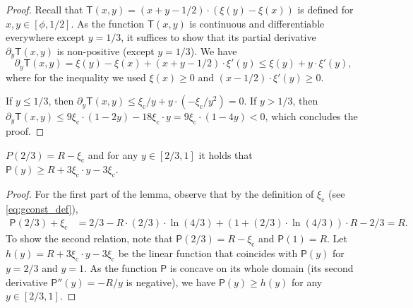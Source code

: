 \documentclass[a4paper,USenglish,cleveref]{lipics-v2019}
\newcommand{\R}{\ensuremath{R}}
\newcommand{\smallBoundary}{\ensuremath{\phi}}
\newcommand{\gconst}{\ensuremath{\xi_\mathrm{c}}}
\newcommand{\g}{\ensuremath{\xi}}
\newcommand{\cutintegral}{\textsf{P}}
\newcommand{\T}{\textsf{T}}
\begin{document}
  \begin{proof}
  Recall that $\T(x,y) = (x+y-1/2) \cdot (\g(y) - \g(x))$ is defined for $x,y \in [\smallBoundary,1/2]$.
  As the function $\T(x,y)$ is continuous and differentiable everywhere except $y = 1/3$,
  it suffices to show that its partial derivative $\partial_y \T(x,y)$ is non-positive (except $y = 1/3$).
  We have 
  \[
    \partial_y \T(x,y) = \g(y) - \g(x) + (x+y-1/2) \cdot \g'(y) \leq \g(y) + y \cdot \g'(y),
  \]
  where for the inequality we used $\g(x) \geq 0$ and $(x-1/2) \cdot \g'(y) \geq 0$.
  
  If $y \leq 1/3$, then $\partial_y \T(x,y)
  \leq \gconst/y + y \cdot (- \gconst/y^2) = 0$. If $y > 1/3$, then $\partial_y
  \T(x,y) \leq 9 \gconst \cdot (1 - 2y) - 18 \gconst \cdot y = 9 \gconst \cdot (1-4y) <
  0$, which concludes the proof.
  \end{proof}
  
    
  


\begin{lemma}
  \label{lem:P2x_approx}
  $P(2/3) = \R - \gconst$ and 
  for any $y \in [2/3, 1]$ it holds that $\cutintegral(y) \geq \R + 3 \gconst \cdot y - 3 \gconst$.
  \end{lemma}
  
\begin{proof}
  For the first part of the lemma, observe that 
  by the definition of $\gconst$ (see \eqref{eq:gconst_def}), 
  \begin{align*}
    \cutintegral(2/3) + \gconst 
      & = 2/3 - \R \cdot (2/3) \cdot \ln (4/3) + 
        (1 + (2/3) \cdot \ln(4/3)) \cdot \R - 2/3 = \R.
  \end{align*}
  To show the second relation, note that 
  $\cutintegral(2/3) = \R - \gconst$ and $\cutintegral(1) = \R$. 
  Let $h(y) = R + 3 \gconst \cdot y - 3 \gconst$ 
  be the linear function that coincides with $\cutintegral(y)$ for $y = 2/3$ and $y = 1$.
  As the function $\cutintegral$ is concave on its whole domain (its second derivative 
  $\cutintegral''(y) = -R/y$ is negative), we have $\cutintegral(y) \geq h(y)$ for any $y \in [2/3,1]$.
\end{proof}
  
\end{document}
